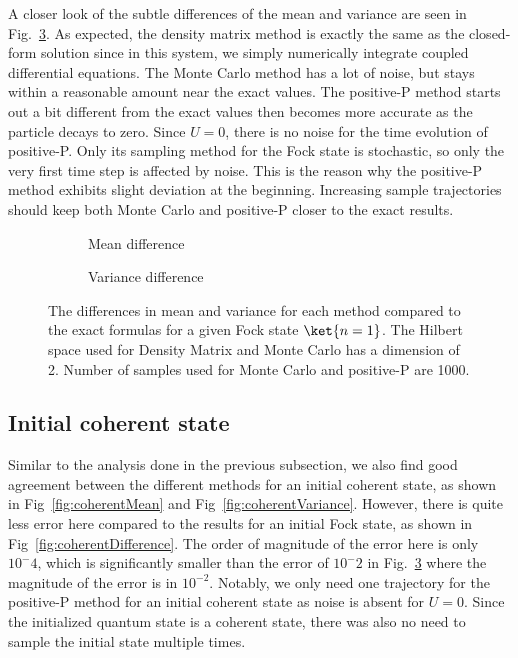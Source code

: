 \hspace{\parindent} A closer look of the subtle differences of the mean and variance are seen in Fig.~\ref{fig:fockDifference}. As expected, the density matrix method is exactly the same as the closed-form solution since in this system, we simply numerically integrate coupled differential equations. The Monte Carlo method has a lot of noise, but stays within a reasonable amount near the exact values. The positive-P method starts out a bit different from the exact values then becomes more accurate as the particle decays to zero. Since $U=0$, there is no noise for the time evolution of positive-P. Only its sampling method for the Fock state is stochastic, so only the very first time step is affected by noise. This is the reason why the positive-P method exhibits slight deviation at the beginning. Increasing sample trajectories should keep both Monte Carlo and positive-P closer to the exact results.

\begin{figure}[h]
  \centering
  \begin{subfigure}{0.48\columnwidth}
    \centering
    
    \caption{Mean difference}
    \label{fig:fockMeanDifference}
  \end{subfigure}
  \hfill
  \begin{subfigure}{0.48\columnwidth}
    \centering
    
    \caption{Variance difference}
    \label{fig:fockVarDifference}
  \end{subfigure}
  \caption{
  The differences in mean and variance for each method compared to the exact formulas for a given Fock state $\ket{n=1}$. The Hilbert space used for Density Matrix and Monte Carlo has a dimension of 2. Number of samples used for Monte Carlo and positive-P are 1000. 
  }
  \label{fig:fockDifference}
\end{figure}



\subsection{Initial coherent state}
\hspace{\parindent} Similar to the analysis done in the previous subsection, we also find good agreement between the different methods for an initial coherent state, as shown in Fig~\ref{fig:coherentMean} and Fig~\ref{fig:coherentVariance}. However, there is quite less error here compared to the results for an initial Fock state, as shown in Fig~\ref{fig:coherentDifference}. The order of magnitude of the error here is only $10^-4$, which is significantly smaller than the error of $10^-2$ in Fig.~\ref{fig:fockDifference} where the magnitude of the error is in $10^{-2}$. Notably, we only need one trajectory for the positive-P method for an initial coherent state as noise is absent for $U=0$. Since the initialized quantum state is a coherent state, there was also no need to sample the initial state multiple times.

